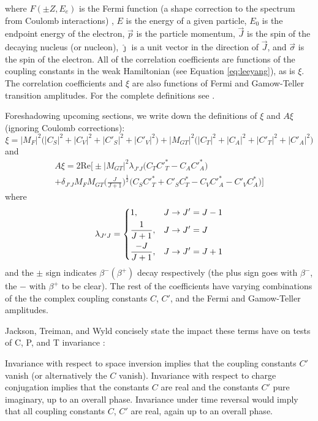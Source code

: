 %
where $F(\pm Z, E_e)$ is the Fermi function (a shape correction to the spectrum
from Coulomb interactions) \cite{fermi1934versuch, wilkinson1982}, $E$ is the energy of a given particle, $E_0$ is the endpoint
energy of the electron, $\vec{p}$ is the particle momentum, $\vec{J}$ is the spin of the
decaying nucleus (or nucleon), $\hat{\jmath}$ is a unit vector in the direction of $\vec{J}$,
and $\vec{\sigma}$ is the spin of the electron. All of the correlation coefficients
are functions of the coupling constants in the weak Hamiltonian (see Equation \ref{eq:leeyang}),
as is $\xi$. The correlation coefficients and $\xi$ are also functions of Fermi and Gamow-Teller
transition amplitudes. For the complete definitions see \cite{jackson1957a,jackson1957b,ebel1957}.

Foreshadowing upcoming sections, we write down the definitions of $\xi$ and $A\xi$ (ignoring Coulomb
corrections):
%
\begin{equation}
  \xi = |M_F|^2\big(|C_S|^2+|C_V|^2+|C'_S|^2+|C'_V|^2\big)+|M_{GT}|^2\big(|C_T|^2+|C_A|^2+|C'_T|^2+|C'_A|^2\big)
  \label{eq:xi}
\end{equation}
%
and
\begin{multline}
  A\xi = 2\mathrm{Re}\bigg[\pm |M_{GT}|^2 \lambda_{J'J}\big(C_TC'^*_T-C_AC'^*_A \big) \\
    + \delta_{J'J}M_FM_{GT}\bigg( \frac{J}{J+1} \bigg)^{\frac{1}{2}}\big(C_SC'^*_T+C'_SC^*_T -C_VC'^*_A-C'_VC^*_A \big) \bigg]
  \label{eq:XiA}
\end{multline}
where
\begin{equation}
\lambda_{J'J} =
\begin{dcases}
  1, & J\rightarrow J'=J-1 \\
  \frac{1}{J+1}, &  J\rightarrow J'=J \\
  \frac{-J}{J+1}, &  J\rightarrow J'=J+1 \\
\end{dcases}
\end{equation}
and the $\pm$ sign indicates $\beta^-(\beta^+)$ decay respectively (the plus sign goes with
$\beta^-$, the $-$ with $\beta^+$ to be clear).
The rest of the coefficients have varying combinations of the the complex coupling
constants $C$, $C'$, and the Fermi and
Gamow-Teller amplitudes.

Jackson, Treiman, and Wyld concisely state the impact these terms have on tests of C, P, and
T invariance \cite{jackson1957b}:
\begin{displayquote}
Invariance with respect to space inversion implies that the coupling constants $C'$
vanish (or alternatively the $C$ vanish). Invariance with respect to charge
conjugation implies that the constants $C$ are real and the constants $C'$
pure imaginary, up to an overall phase. Invariance under time reversal
would imply that all coupling constants $C$, $C'$ are real, again up to an
overall phase.
\end{displayquote}

